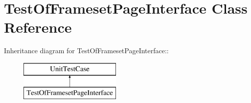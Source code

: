 \hypertarget{class_test_of_frameset_page_interface}{
\section{TestOfFramesetPageInterface Class Reference}
\label{class_test_of_frameset_page_interface}
}
Inheritance diagram for TestOfFramesetPageInterface::\begin{figure}[H]
\begin{center}
\leavevmode
\includegraphics[height=2cm]{class_test_of_frameset_page_interface}
\end{center}
\end{figure}
